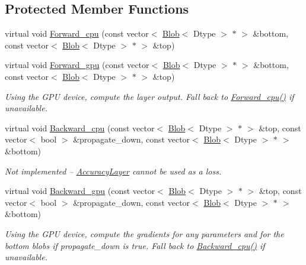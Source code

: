 \subsection*{Protected Member Functions}
\begin{DoxyCompactItemize}
\item 
virtual void \hyperlink{classcaffe_1_1AccuracyLayer_a8f7719cdffb48b7e48c29a89131f85b6}{Forward\+\_\+cpu} (const vector$<$ \hyperlink{classcaffe_1_1Blob}{Blob}$<$ Dtype $>$ $\ast$ $>$ \&bottom, const vector$<$ \hyperlink{classcaffe_1_1Blob}{Blob}$<$ Dtype $>$ $\ast$ $>$ \&top)
\item 
virtual void \hyperlink{classcaffe_1_1AccuracyLayer_a0c27449b74f79bcd9dfb5dd877c8cfdf}{Forward\+\_\+gpu} (const vector$<$ \hyperlink{classcaffe_1_1Blob}{Blob}$<$ Dtype $>$ $\ast$ $>$ \&bottom, const vector$<$ \hyperlink{classcaffe_1_1Blob}{Blob}$<$ Dtype $>$ $\ast$ $>$ \&top)\hypertarget{classcaffe_1_1AccuracyLayer_a0c27449b74f79bcd9dfb5dd877c8cfdf}{}\label{classcaffe_1_1AccuracyLayer_a0c27449b74f79bcd9dfb5dd877c8cfdf}

\begin{DoxyCompactList}\small\item\em Using the G\+PU device, compute the layer output. Fall back to \hyperlink{classcaffe_1_1AccuracyLayer_a8f7719cdffb48b7e48c29a89131f85b6}{Forward\+\_\+cpu()} if unavailable. \end{DoxyCompactList}\item 
virtual void \hyperlink{classcaffe_1_1AccuracyLayer_a1bf798e77b5dc7cd4e65e9e07ea71dac}{Backward\+\_\+cpu} (const vector$<$ \hyperlink{classcaffe_1_1Blob}{Blob}$<$ Dtype $>$ $\ast$ $>$ \&top, const vector$<$ bool $>$ \&propagate\+\_\+down, const vector$<$ \hyperlink{classcaffe_1_1Blob}{Blob}$<$ Dtype $>$ $\ast$ $>$ \&bottom)\hypertarget{classcaffe_1_1AccuracyLayer_a1bf798e77b5dc7cd4e65e9e07ea71dac}{}\label{classcaffe_1_1AccuracyLayer_a1bf798e77b5dc7cd4e65e9e07ea71dac}

\begin{DoxyCompactList}\small\item\em Not implemented -- \hyperlink{classcaffe_1_1AccuracyLayer}{Accuracy\+Layer} cannot be used as a loss. \end{DoxyCompactList}\item 
virtual void \hyperlink{classcaffe_1_1AccuracyLayer_a19e1b977ebd70b5330ed91188a1fc37d}{Backward\+\_\+gpu} (const vector$<$ \hyperlink{classcaffe_1_1Blob}{Blob}$<$ Dtype $>$ $\ast$ $>$ \&top, const vector$<$ bool $>$ \&propagate\+\_\+down, const vector$<$ \hyperlink{classcaffe_1_1Blob}{Blob}$<$ Dtype $>$ $\ast$ $>$ \&bottom)\hypertarget{classcaffe_1_1AccuracyLayer_a19e1b977ebd70b5330ed91188a1fc37d}{}\label{classcaffe_1_1AccuracyLayer_a19e1b977ebd70b5330ed91188a1fc37d}

\begin{DoxyCompactList}\small\item\em Using the G\+PU device, compute the gradients for any parameters and for the bottom blobs if propagate\+\_\+down is true. Fall back to \hyperlink{classcaffe_1_1AccuracyLayer_a1bf798e77b5dc7cd4e65e9e07ea71dac}{Backward\+\_\+cpu()} if unavailable. \end{DoxyCompactList}\end{DoxyCompactItemize}
